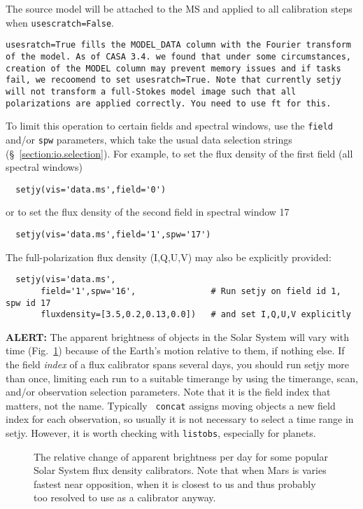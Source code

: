 The source model will be attached to the MS and applied to all
calibration steps when {\tt usescratch=False}. {\tt usesratch=True
  fills the MODEL\_DATA column with the Fourier transform of the
  model. As of CASA 3.4. we found that under some circumstances,
  creation of the MODEL column may prevent memory issues and if tasks
  fail, we recoomend to set {\tt usesratch=True}. Note that currently
  {\tt setjy} will not transform a full-Stokes model image such that
  all polarizations are applied correctly.  You need to use {\tt ft}
  for this.


To limit this operation to certain fields and spectral windows, use
the {\tt field} and/or {\tt spw} parameters, which take the usual
data selection strings (\S~\ref{section:io.selection}). For example, 
to set the flux density of the first field (all spectral windows)
\small
\begin{verbatim}
  setjy(vis='data.ms',field='0')
\end{verbatim}
\normalsize
or to set the flux density of the second field in spectral window 17
\small
\begin{verbatim}
  setjy(vis='data.ms',field='1',spw='17')
\end{verbatim}
\normalsize
The full-polarization flux density (I,Q,U,V) may also be explicitly provided:
\small
\begin{verbatim}
  setjy(vis='data.ms',
       field='1',spw='16',               # Run setjy on field id 1, spw id 17
       fluxdensity=[3.5,0.2,0.13,0.0])   # and set I,Q,U,V explicitly
\end{verbatim}
\normalsize


{\bf ALERT:} The apparent brightness of objects in the Solar System
will vary with time (Fig.~\ref{fig:reldelfdperday}) because of the
Earth's motion relative to them, if nothing else.  If the field {\it
  index} of a flux calibrator spans several days, you should run setjy
more than once, limiting each run to a suitable timerange by using the
timerange, scan, and/or observation selection parameters.  Note that
it is the field index that matters, not the name.  Typically {\tt
  concat} assigns moving objects a new field index for each
observation, so usually it is not necessary to select a time range in
setjy.  However, it is worth checking with {\tt listobs}, especially
for planets.

\begin{figure}
\label{fig:reldelfdperday}
\caption{The relative change of apparent brightness per day for some
popular Solar System flux density calibrators.  Note that when Mars is
varies fastest near opposition, when it is closest to us and thus probably
too resolved to use as a calibrator anyway.}  
\end{figure}


}
